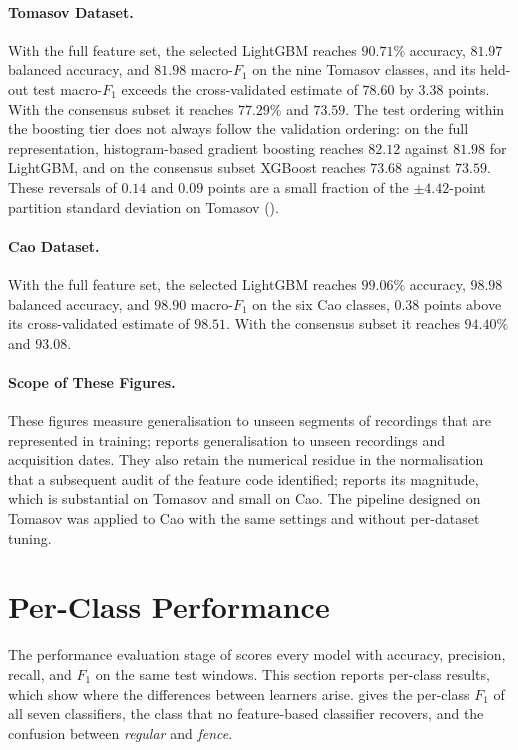 \paragraph[Tomasov Dataset]{Tomasov Dataset.}
With the full feature set, the selected LightGBM reaches $90.71\%$ accuracy, $81.97$ balanced accuracy, and $81.98$ macro-$F_1$ on the nine Tomasov classes, and its held-out test macro-$F_1$ exceeds the cross-validated estimate of $78.60$ by $3.38$ points. With the consensus subset it reaches $77.29\%$ and $73.59$. The test ordering within the boosting tier does not always follow the validation ordering: on the full representation, histogram-based gradient boosting reaches $82.12$ against $81.98$ for LightGBM, and on the consensus subset XGBoost reaches $73.68$ against $73.59$. These reversals of $0.14$ and $0.09$ points are a small fraction of the $\pm 4.42$-point partition standard deviation on Tomasov ().

\paragraph[Cao Dataset]{Cao Dataset.}
With the full feature set, the selected LightGBM reaches $99.06\%$ accuracy, $98.98$ balanced accuracy, and $98.90$ macro-$F_1$ on the six Cao classes, $0.38$ points above its cross-validated estimate of $98.51$. With the consensus subset it reaches $94.40\%$ and $93.08$.

\paragraph[Scope of These Figures]{Scope of These Figures.}
These figures measure generalisation to unseen segments of recordings that are represented in training;  reports generalisation to unseen recordings and acquisition dates. They also retain the numerical residue in the normalisation that a subsequent audit of the feature code identified;  reports its magnitude, which is substantial on Tomasov and small on Cao. The pipeline designed on Tomasov was applied to Cao with the same settings and without per-dataset tuning.

\section{Per-Class Performance}
\label{sec:resPerformance}
The performance evaluation stage of  scores every model with accuracy, precision, recall, and $F_1$ on the same test windows. This section reports per-class results, which show where the differences between learners arise.  gives the per-class $F_1$ of all seven classifiers,  the class that no feature-based classifier recovers, and  the confusion between \emph{regular} and \emph{fence}.


